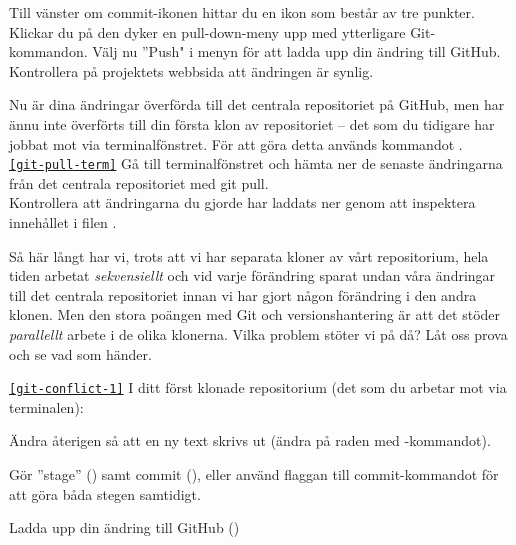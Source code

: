 \begin{Datorarbete}
\item Till vänster om commit-ikonen hittar du en ikon som består av tre punkter. Klickar du på den dyker en pull-down-meny upp med ytterligare Git-kommandon. Välj nu ''Push" i menyn för att ladda upp din ändring till GitHub. Kontrollera på projektets webbsida att ändringen är synlig.

\item Nu är dina ändringar överförda till det centrala repositoriet på GitHub, men har ännu inte överförts till din första klon av repositoriet -- det som du tidigare har jobbat mot via terminalfönstret. För att göra detta används kommandot .
\\


\texttt{\ref{git-pull-term}}  Gå till terminalfönstret och hämta ner de senaste ändringarna från det centrala repositoriet med git pull.
\\


Kontrollera att ändringarna du gjorde har laddats ner genom att inspektera innehållet i filen .

\item Så här långt har vi, trots att vi har separata kloner av vårt repositorium, hela tiden arbetat \emph{sekvensiellt} och vid varje förändring sparat undan våra ändringar till det centrala repositoriet innan vi har gjort någon förändring i den andra klonen. Men den stora poängen med Git och versionshantering är att det stöder \emph{parallellt} arbete i de olika klonerna. Vilka problem stöter vi på då? Låt oss prova och se vad som händer.


\texttt{\ref{git-conflict-1}} I ditt först klonade repositorium (det som du arbetar mot via terminalen):
\begin{Deluppgifter}
\item Ändra återigen  så att en ny text skrivs ut (ändra på raden med -kommandot).
\item Gör ''stage'' () samt commit (), eller använd flaggan  till commit-kommandot för att göra båda stegen samtidigt.
\item Ladda upp din ändring till GitHub ()
\end{Deluppgifter}


\end{Datorarbete}
